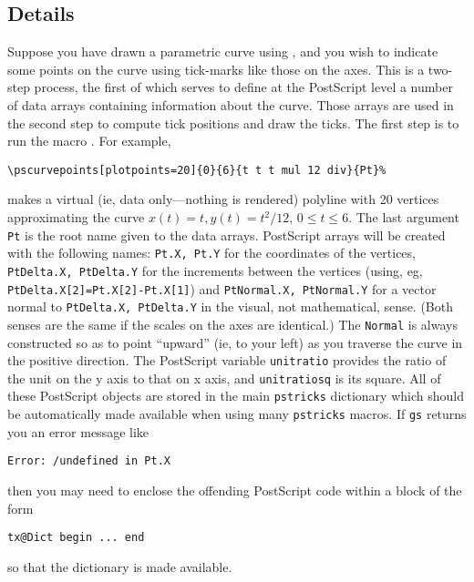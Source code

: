 \documentclass[11pt,english,BCOR10mm,DIV12,bibliography=totoc,parskip=false,smallheadings
    headexclude,footexclude,oneside]{pst-doc}
\begin{document}
\subsection{Details}
Suppose you have drawn a parametric curve using , and you wish to 
indicate some points on the curve using tick-marks like those  on the axes. This is a 
two-step process, the first of which serves to define at the PostScript level a 
number of data arrays containing information about the curve. Those arrays are used 
in the second step to compute tick positions and draw the ticks. The first step is 
to run the macro . For example,

\begin{verbatim}
\pscurvepoints[plotpoints=20]{0}{6}{t t t mul 12 div}{Pt}%
\end{verbatim}
makes a virtual (ie, data only---nothing is rendered) polyline with 20 vertices approximating 
the curve $x(t)=t, y(t)=t^2/12$, $0\le t\le 6$. The last argument {\tt Pt} is the root name 
given to the data arrays.  PostScript arrays will be created with the following names: {\tt Pt.X, Pt.Y} 
for the coordinates of the vertices, {\tt PtDelta.X, PtDelta.Y} for the increments between the 
vertices (using, eg, {\tt PtDelta.X[2]=Pt.X[2]-Pt.X[1]}) and {\tt PtNormal.X, PtNormal.Y} for 
a vector normal to {\tt PtDelta.X, PtDelta.Y} in the visual, not mathematical, sense. 
(Both senses are the same if the scales on the axes are identical.) The {\tt Normal} is 
always constructed so as to point ``upward'' (ie, to your left) as you traverse the curve 
in the positive direction. The PostScript variable {\tt unitratio} provides the ratio of 
the unit on the y axis to that on x axis, and {\tt unitratiosq} is its square. All of 
these PostScript objects are stored in the main {\tt pstricks} dictionary  
which should be automatically made available when using many {\tt pstricks} macros. 
If {\tt gs} returns you an error message like
\begin{verbatim}
Error: /undefined in Pt.X
\end{verbatim}
then you may need to enclose the offending PostScript code within a block of the form
\begin{verbatim}
tx@Dict begin ... end
\end{verbatim}
so that the dictionary is made available.
\end{document}
